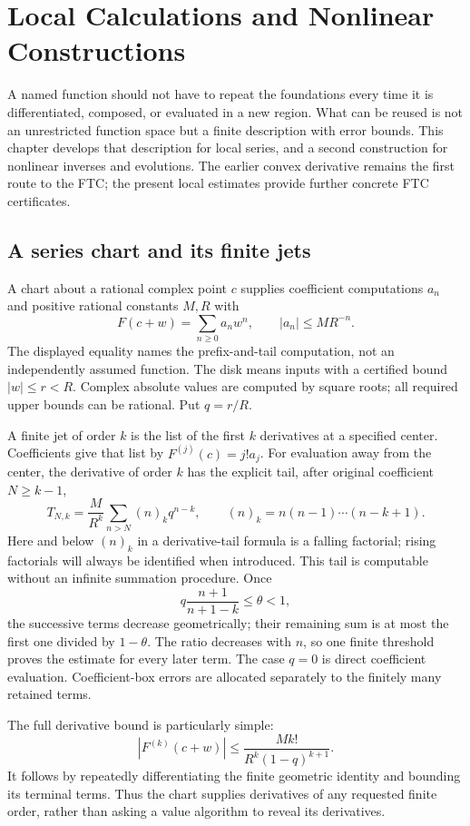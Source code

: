 \chapter{Local Calculations and Nonlinear Constructions}
\label{ch:local-models}

A named function should not have to repeat the foundations every time it
is differentiated, composed, or evaluated in a new region.  What can be
reused is not an unrestricted function space but a finite description
with error bounds.  This chapter develops that description for local
series, and a second construction for nonlinear inverses and evolutions.
The earlier convex derivative remains the first route to the FTC; the
present local estimates provide further concrete FTC certificates.

\section{A series chart and its finite jets}
A chart about a rational complex point $c$ supplies coefficient
computations $a_n$ and positive rational constants $M,R$ with
\[
 F(c+w)=\sum_{n\ge0}a_nw^n,\qquad |a_n|\le M R^{-n}.
\]
The displayed equality names the prefix-and-tail computation, not an
independently assumed function.  The disk means inputs with a certified
bound $|w|\le r<R$.  Complex absolute values are computed by square roots;
all required upper bounds can be rational.  Put $q=r/R$.

A finite jet of order $k$ is the list of the first $k$ derivatives at a
specified center.  Coefficients give that list by $F^{(j)}(c)=j!a_j$.
For evaluation away from the center, the derivative of order $k$ has the
explicit tail, after original coefficient $N\ge k-1$,
\[
 T_{N,k}=\frac{M}{R^k}\sum_{n>N}(n)_k q^{n-k},
 \qquad (n)_k=n(n-1)\cdots(n-k+1).
\]
Here and below $(n)_k$ in a derivative-tail formula is a falling factorial;
rising factorials will always be identified when introduced.  This tail
is computable without an infinite summation procedure.  Once
\[
 q\frac{n+1}{n+1-k}\le\theta<1,
\]
the successive terms decrease geometrically; their remaining sum is at
most the first one divided by $1-\theta$.  The ratio decreases with $n$,
so one finite threshold proves the estimate for every later term.  The
case $q=0$ is direct coefficient evaluation.  Coefficient-box errors are
allocated separately to the finitely many retained terms.

The full derivative bound is particularly simple:
\[
 |F^{(k)}(c+w)|\le\frac{M k!}{R^k(1-q)^{k+1}}.
\]
It follows by repeatedly differentiating the finite geometric identity
and bounding its terminal terms.  Thus the chart supplies derivatives of
any requested finite order, rather than asking a value algorithm to reveal
its derivatives.

